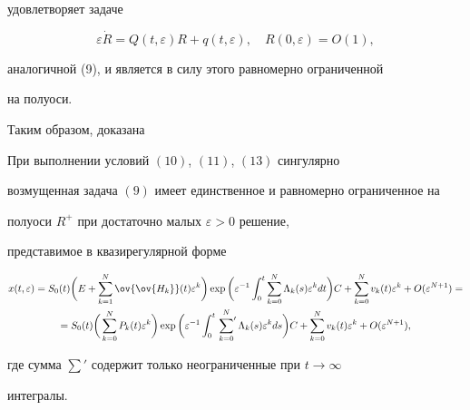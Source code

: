 удовлетворяет задаче


$$


\varepsilon\Dot{R}=Q(t,\varepsilon)R+q(t,\varepsilon),


\quad R(0,\varepsilon)=O(1),


$$


аналогичной (9), и является в силу этого равномерно ограниченной 


на полуоси.





Таким образом, доказана








\begin{thm}


При выполнении условий $(10)$, $(11)$, $(13)$ сингулярно 


возмущенная задача $(9)$ имеет единственное и равномерно ограниченное на 


полуоси $R^+$ при достаточно малых $\varepsilon>0$ решение, 


представимое в квазирегулярной форме


\begin{multline*}


x(t,\varepsilon)=S_0(t)\bigg(E+\sum^{N}_{k=1}\ov{\ov{H_k}}(t)\varepsilon^k\bigg)


\exp \bigg(\varepsilon^{-1}\int^{t}_{0}\sum^{N}_{k=0}\Lambda_k(s)\varepsilon^k


dt\bigg)C+\sum^{N}_{k=0}v_k(t)\varepsilon^k+O(\varepsilon^{N+1})= \\


%


=S_0(t)\bigg(\sum^{N}_{k=0}P_k(t)\varepsilon^k\bigg)


\exp \bigg(\varepsilon^{-1}\int^{t}_{0}


\sideset{}{'}\sum^{N}_{k=0}\Lambda_k(s)\varepsilon^k ds\bigg)C+


\sum^{N}_{k=0}v_k(t)\varepsilon^k+O(\varepsilon^{N+1}),


\end{multline*}


где сумма $\sum'$ содержит только неограниченные при $t \to\infty$ 


интегралы.


\end{thm}





